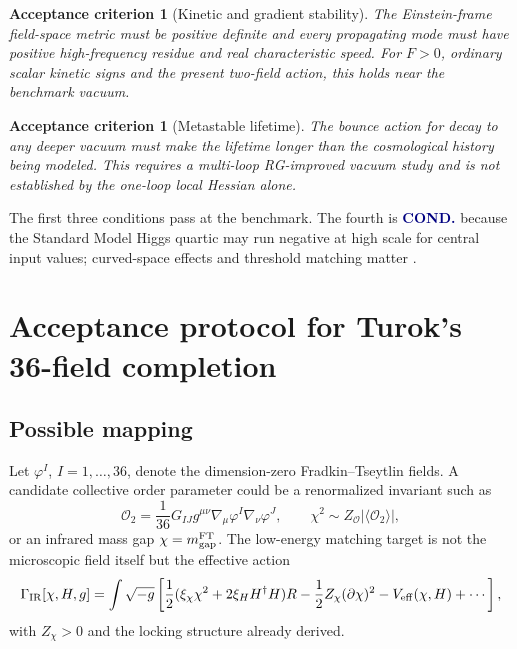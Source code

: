\documentclass[11pt,a4paper]{article}
\newtheorem{criterion}[definition]{Acceptance criterion}
\newcommand{\IR}{\mathrm{IR}}
\newcommand{\Conditional}{\textcolor{navy}{\textbf{COND.}}}
\begin{document}
\begin{criterion}[Kinetic and gradient stability]
The Einstein-frame field-space metric must be positive definite and every propagating mode must have positive high-frequency residue and real characteristic speed. For $F>0$, ordinary scalar kinetic signs and the present two-field action, this holds near the benchmark vacuum.
\end{criterion}

\begin{criterion}[Metastable lifetime]
The bounce action for decay to any deeper vacuum must make the lifetime longer than the cosmological history being modeled. This requires a multi-loop RG-improved vacuum study and is not established by the one-loop local Hessian alone.
\end{criterion}

The first three conditions pass at the benchmark. The fourth is \Conditional{} because the Standard Model Higgs quartic may run negative at high scale for central input values; curved-space effects and threshold matching matter \cite{Markkanen2018}.

\section{Acceptance protocol for Turok's 36-field completion}
\label{sec:turok}

\subsection{Possible mapping}

Let $\varphi^I$, $I=1,\ldots,36$, denote the dimension-zero Fradkin--Tseytlin fields. A candidate collective order parameter could be a renormalized invariant such as
\begin{equation}
\mathcal O_2=
\frac1{36}G_{IJ}g^{\mu\nu}
\nabla_\mu\varphi^I\nabla_\nu\varphi^J,
\qquad
\chi^2\sim Z_{\mathcal O}|\langle\mathcal O_2\rangle|,
\label{eq:FTmap}
\end{equation}
or an infrared mass gap $\chi=m_{\rm gap}^{\rm FT}$. The low-energy matching target is not the microscopic field itself but the effective action
\begin{equation}
\Gamma_{\IR}[\chi,H,g]=\int\sqrt{-g}\left[
\frac12(\xi_\chi\chi^2+2\xi_HH^\dagger H)R
-\frac12Z_\chi(\partial\chi)^2
-V_{\rm eff}(\chi,H)+\cdots
\right],
\label{eq:IRtarget}
\end{equation}
with $Z_\chi>0$ and the locking structure already derived.
\end{document}
